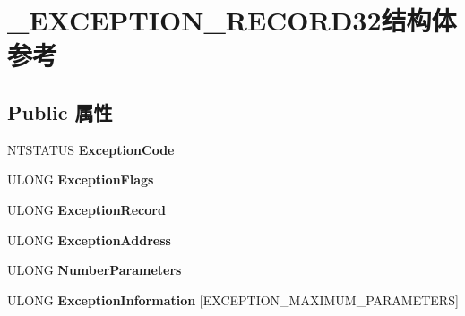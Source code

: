 \hypertarget{struct___e_x_c_e_p_t_i_o_n___r_e_c_o_r_d32}{}\section{\+\_\+\+E\+X\+C\+E\+P\+T\+I\+O\+N\+\_\+\+R\+E\+C\+O\+R\+D32结构体 参考}
\label{struct___e_x_c_e_p_t_i_o_n___r_e_c_o_r_d32}
\subsection*{Public 属性}
\begin{DoxyCompactItemize}
\item 
\mbox{\label{struct___e_x_c_e_p_t_i_o_n___r_e_c_o_r_d32_a578e9e4574557fac82ba150e05e83a2f}} 
N\+T\+S\+T\+A\+T\+US {\bfseries Exception\+Code}
\item 
\mbox{\label{struct___e_x_c_e_p_t_i_o_n___r_e_c_o_r_d32_a190365b9dc7084eadc6b7d9f96db0d27}} 
U\+L\+O\+NG {\bfseries Exception\+Flags}
\item 
\mbox{\label{struct___e_x_c_e_p_t_i_o_n___r_e_c_o_r_d32_a8d922d1d1ee80b1f827fb380d30a2467}} 
U\+L\+O\+NG {\bfseries Exception\+Record}
\item 
\mbox{\label{struct___e_x_c_e_p_t_i_o_n___r_e_c_o_r_d32_af5b25d4c884ff11c7d5e7cac1c2f0ecb}} 
U\+L\+O\+NG {\bfseries Exception\+Address}
\item 
\mbox{\label{struct___e_x_c_e_p_t_i_o_n___r_e_c_o_r_d32_afea960dde7bfad72e04086f26030c2a8}} 
U\+L\+O\+NG {\bfseries Number\+Parameters}
\item 
\mbox{\label{struct___e_x_c_e_p_t_i_o_n___r_e_c_o_r_d32_ac103a48a20fcf80fd71b5a18ae80da01}} 
U\+L\+O\+NG {\bfseries Exception\+Information} \mbox{[}E\+X\+C\+E\+P\+T\+I\+O\+N\+\_\+\+M\+A\+X\+I\+M\+U\+M\+\_\+\+P\+A\+R\+A\+M\+E\+T\+E\+RS\mbox{]}
\item 
\mbox{\label{struct___e_x_c_e_p_t_i_o_n___r_e_c_o_r_d32_a671d040e35d7fa194924ef10f3d08154}} 

\end{DoxyCompactItemize}
